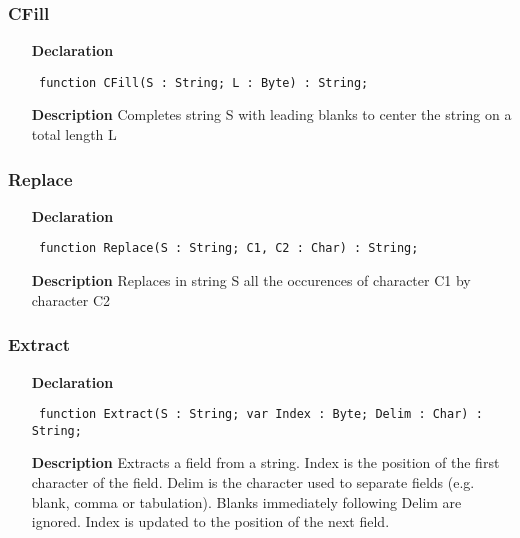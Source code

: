 \documentclass[12pt,a4paper,oneside]{report}
\newcommand{\declarationitem}[1]{\textbf{#1}}
\newcommand{\descriptiontitle}[1]{\textbf{#1}}
\newcommand{\code}[1]{\texttt{#1}}
\begin{document}
\subsubsection{CFill}
\label{ustrings-CFill}
\begin{itemize}\item[\declarationitem{Declaration}\hfill]
	\begin{flushleft}
		\code{
			function CFill(S : String; L : Byte) : String;}
		
	\end{flushleft}
	
	\par
	\item[\descriptiontitle{Description}]
	Completes string S with leading blanks to center the string on a total length L
	
\end{itemize}
\subsubsection{Replace}
\label{ustrings-Replace}
\begin{itemize}\item[\declarationitem{Declaration}\hfill]
	\begin{flushleft}
		\code{
			function Replace(S : String; C1, C2 : Char) : String;}
		
	\end{flushleft}
	
	\par
	\item[\descriptiontitle{Description}]
	Replaces in string S all the occurences of character C1 by character C2
	
\end{itemize}
\subsubsection{Extract}
\label{ustrings-Extract}
\begin{itemize}\item[\declarationitem{Declaration}\hfill]
	\begin{flushleft}
		\code{
			function Extract(S : String; var Index : Byte; Delim : Char) : String;}
		
	\end{flushleft}
	
	\par
	\item[\descriptiontitle{Description}]
	Extracts a field from a string. Index is the position of the first character of the field. Delim is the character used to separate fields (e.g. blank, comma or tabulation). Blanks immediately following Delim are ignored. Index is updated to the position of the next field.
	
\end{itemize}
\end{document}
